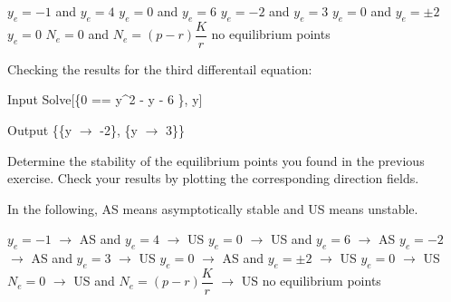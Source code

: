 \begin{Answer}
    \begin{multicols}{2}
        \Question $y_e = -1$ \quad and \quad $y_e = 4$
        \Question $y_e = 0$ \quad and \quad $y_e = 6$
        \Question $y_e = -2$ \quad and \quad $y_e = 3$
        \Question $y_e = 0$ \quad and \quad $y_e = \pm2$
        \Question $y_e = 0$
        \Question $N_e = 0$ \quad and \quad $N_e = (p-r)\dfrac{K}{r}$
        \Question no equilibrium points
        \EndCurrentQuestion
    \end{multicols}
    
    Checking the results for the third differentail equation:
        \begin{mdframed}[default,backgroundcolor=gray!40,roundcorner=8pt]
        \begin{mmaCell}{Input}
          Solve[\{0 == y^2 - y - 6 \}, y]
        \end{mmaCell}

        \begin{mmaCell}{Output}
        	 \{\{y \(\to\) -2\}, \{y \(\to\) 3\}\}
        \end{mmaCell}
        \end{mdframed}
\end{Answer}

\begin{Exercise}
	\Question Determine the stability of the equilibrium points you found in the previous exercise. Check your results by plotting the corresponding direction fields.
    \EndCurrentQuestion
\end{Exercise}

\begin{Answer}In the following, AS means asymptotically stable and US means unstable.

        \Question $y_e = -1$ $\rightarrow$ AS \quad and \quad $y_e = 4$ $\rightarrow$ US
        \Question $y_e = 0$ $\rightarrow$ US \quad and \quad $y_e = 6$ $\rightarrow$ AS
        \Question $y_e = -2$ $\rightarrow$ AS \quad and \quad $y_e = 3$ $\rightarrow$ US
        \Question $y_e = 0$ $\rightarrow$ AS \quad and \quad $y_e = \pm2$ $\rightarrow$ US
        \Question $y_e = 0$ $\rightarrow$ US
        \Question $N_e = 0$ $\rightarrow$ US \quad and \quad $N_e = (p-r)\dfrac{K}{r}$ $\rightarrow$ US
        \Question no equilibrium points
    
    \EndCurrentQuestion
\end{Answer}


